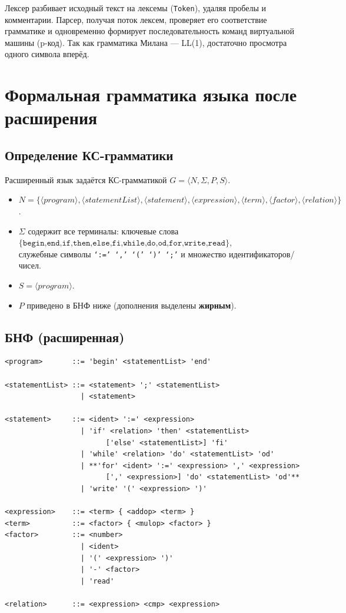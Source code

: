 \documentclass[areasetadvanced]{scrartcl}
\begin{document}
    Лексер разбивает исходный текст на лексемы (\texttt{Token}),
    удаляя пробелы и комментарии.
    Парсер, получая поток лексем, проверяет его соответствие грамматике
    и одновременно формирует последовательность команд
    виртуальной машины (p-код).
    Так как грамматика Милана — LL(1), достаточно просмотра
    одного символа вперёд.
    
   \newpage
\section{Формальная грамматика языка после расширения}
\subsection{Определение КС-грамматики}

Расширенный язык задаётся КС-грамматикой
$G=\langle N,\Sigma,P,S\rangle$.

\begin{itemize}
  \item $N=\{\langle program\rangle,\langle statementList\rangle,
            \langle statement\rangle,\langle expression\rangle,
            \langle term\rangle,\langle factor\rangle,
            \langle relation\rangle\}$.
  \item $\Sigma$ содержит все терминалы: ключевые слова \\
        $\{\texttt{begin,end,if,then,else,fi,while,do,od,for,write,read}\}$, \\
        служебные символы \texttt{‘:=’ ‘,’ ‘(’ ‘)’ ‘;’}  
        и множество идентификаторов/чисел.
  \item $S=\langle program\rangle$.
  \item $P$ приведено в БНФ ниже (дополнения выделены \textbf{жирным}).
\end{itemize}

\subsection{БНФ (расширенная)}

\begin{verbatim}
<program>       ::= 'begin' <statementList> 'end'

<statementList> ::= <statement> ';' <statementList>
                  | <statement>

<statement>     ::= <ident> ':=' <expression>
                  | 'if' <relation> 'then' <statementList>
                        ['else' <statementList>] 'fi'
                  | 'while' <relation> 'do' <statementList> 'od'
                  | **'for' <ident> ':=' <expression> ',' <expression>
                        [',' <expression>] 'do' <statementList> 'od'**
                  | 'write' '(' <expression> ')'

<expression>    ::= <term> { <addop> <term> }
<term>          ::= <factor> { <mulop> <factor> }
<factor>        ::= <number>
                  | <ident>
                  | '(' <expression> ')'
                  | '-' <factor>
                  | 'read'

<relation>      ::= <expression> <cmp> <expression>
\end{verbatim}
\newpage
\end{document}
